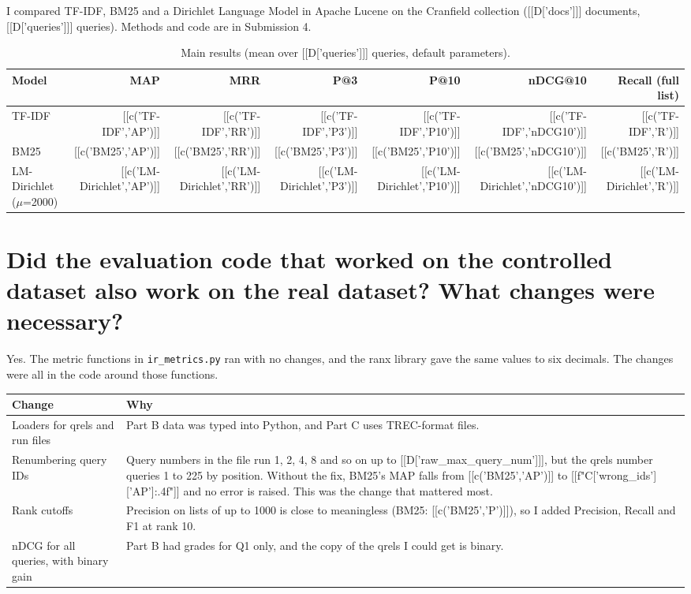 
I compared TF-IDF, BM25 and a Dirichlet Language Model in Apache Lucene on the Cranfield collection ([[D['docs']]] documents, [[D['queries']]] queries). Methods and code are in Submission 4.
\begin{table}[H]\small\centering\caption{Main results (mean over [[D['queries']]] queries, default parameters).}
\begin{tabular}{@{}lrrrrrr@{}}\toprule
Model & MAP & MRR & P@3 & P@10 & nDCG@10 & Recall (full list) \\\midrule
TF-IDF & [[c('TF-IDF','AP')]] & [[c('TF-IDF','RR')]] & [[c('TF-IDF','P3')]] & [[c('TF-IDF','P10')]] & [[c('TF-IDF','nDCG10')]] & [[c('TF-IDF','R')]] \\
BM25 & [[c('BM25','AP')]] & [[c('BM25','RR')]] & [[c('BM25','P3')]] & [[c('BM25','P10')]] & [[c('BM25','nDCG10')]] & [[c('BM25','R')]] \\
LM-Dirichlet ($\mu$=2000) & [[c('LM-Dirichlet','AP')]] & [[c('LM-Dirichlet','RR')]] & [[c('LM-Dirichlet','P3')]] & [[c('LM-Dirichlet','P10')]] & [[c('LM-Dirichlet','nDCG10')]] & [[c('LM-Dirichlet','R')]] \\
\bottomrule\end{tabular}\end{table}

\section{Did the evaluation code that worked on the controlled dataset also work on the real dataset? What changes were necessary?}
Yes. The metric functions in \texttt{ir\_metrics.py} ran with no changes, and the ranx library gave the same values to six decimals. The changes were all in the code around those functions.
\begin{table}[H]\small\centering
\begin{tabularx}{\linewidth}{@{}>{\raggedright\arraybackslash}p{1.6in}X@{}}\toprule
Change & Why \\\midrule
Loaders for qrels and run files & Part B data was typed into Python, and Part C uses TREC-format files. \\
Renumbering query IDs & Query numbers in the file run 1, 2, 4, 8 and so on up to [[D['raw_max_query_num']]], but the qrels number queries 1 to 225 by position. Without the fix, BM25's MAP falls from [[c('BM25','AP')]] to [[f"{C['wrong_ids']['AP']:.4f}"]] and no error is raised. This was the change that mattered most. \\
Rank cutoffs & Precision on lists of up to 1000 is close to meaningless (BM25: [[c('BM25','P')]]), so I added Precision, Recall and F1 at rank 10. \\
nDCG for all queries, with binary gain & Part B had grades for Q1 only, and the copy of the qrels I could get is binary. \\
\bottomrule\end{tabularx}\end{table}

